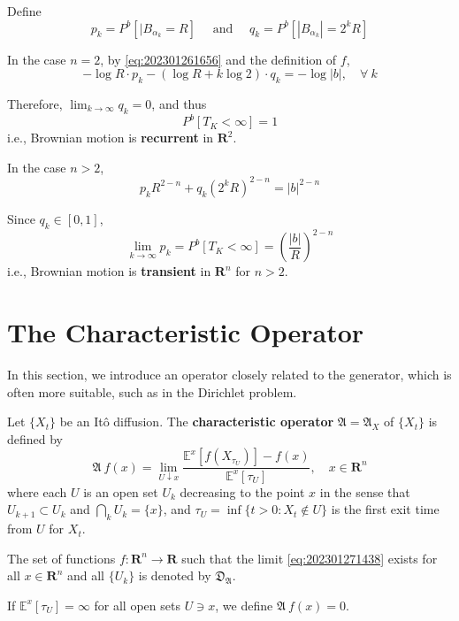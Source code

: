 \begin{example}
    Define 
    \[
        p_k = P^b[|B_{\alpha_k} = R] \quad \text{ and } \quad q_k = P^b[|B_{\alpha_k}| = 2^k R]
    \]

    In the case $n = 2$, by \eqref{eq:202301261656} and the definition of $f$, 
    \[
        - \log R \cdot p_k - (\log R + k \log 2) \cdot q_k = - \log |b|, \quad \forall ~k
    \]

    Therefore, $\lim_{k \to \infty} q_k = 0$, and thus 
    \[
        P^b[T_K < \infty] = 1
    \]
    i.e., Brownian motion is \textbf{recurrent} in $\textbf{R}^2$. 

    In the case $n > 2$, 
    \[
        p_k R^{2-n} + q_k (2^k R)^{2-n} = |b|^{2-n}
    \]

    Since $q_k \in [0,1]$, 
    \[
        \lim_{k \to \infty} p_k = P^b[T_K < \infty] = \left( \frac{|b|}{R} \right)^{2-n}
    \]
    i.e., Brownian motion is \textbf{transient} in $\textbf{R}^n$ for $n > 2$. 
\end{example}

\section{The Characteristic Operator}

In this section, we introduce an operator closely related to the generator, which is often more suitable, such as in the Dirichlet problem.

\begin{definition}
    Let $\{ X_t \}$ be an Itô diffusion. The \textbf{characteristic operator} $\mathfrak{A} = \mathfrak{A}_X$ of $\{ X_t \}$ is defined by 
    \begin{equation}\label{eq:202301271438}
        \mathfrak{A}~f(x) = \lim_{U \downarrow x} \frac{\mathbb{E}^x [ f(X_{\tau_U})] - f(x)}{\mathbb{E}^x [\tau_U]}, \quad x \in \textbf{R}^n
    \end{equation}
    where each $U$ is an open set $U_k$ decreasing to the point $x$ in the sense that $U_{k+1} \subset U_k$ and $\bigcap_k U_k = \{ x \}$, and $\tau_U = \inf \{ t > 0 : X_t \notin U \}$ is the first exit time from $U$ for $X_t$.

    The set of functions $f : \textbf{R}^n \longrightarrow \textbf{R}$ such that the limit \eqref{eq:202301271438} exists for all $x \in \mathbf{R}^n$ and all $\{ U_k \}$ is denoted by $\mathfrak{D}_{\mathfrak{A}}$.

    If $\mathbb{E}^x[\tau_U] = \infty$ for all open sets $U \ni x$, we define $\mathfrak{A}~f(x) = 0$.
\end{definition}


